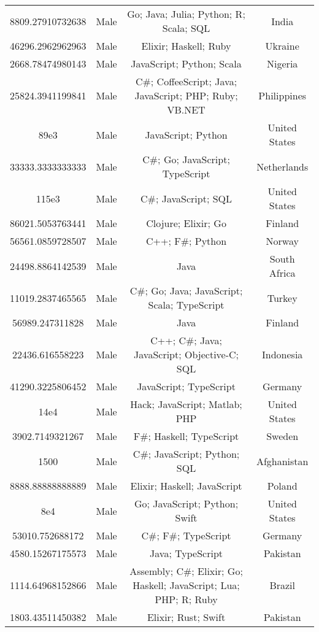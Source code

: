 \begin{center}
\begin{tabular}{ |c|c|c|c| }
8809.27910732638  &  Male  &  Go; Java; Julia; Python; R; Scala; SQL  &  India  \\ 
46296.2962962963  &  Male  &  Elixir; Haskell; Ruby  &  Ukraine  \\ 
2668.78474980143  &  Male  &  JavaScript; Python; Scala  &  Nigeria  \\ 
25824.3941199841  &  Male  &  C\#; CoffeeScript; Java; JavaScript; PHP; Ruby; VB.NET  &  Philippines  \\ 
89e3  &  Male  &  JavaScript; Python  &  United States  \\ 
33333.3333333333  &  Male  &  C\#; Go; JavaScript; TypeScript  &  Netherlands  \\ 
115e3  &  Male  &  C\#; JavaScript; SQL  &  United States  \\ 
86021.5053763441  &  Male  &  Clojure; Elixir; Go  &  Finland  \\ 
56561.0859728507  &  Male  &  C++; F\#; Python  &  Norway  \\ 
24498.8864142539  &  Male  &  Java  &  South Africa  \\ 
11019.2837465565  &  Male  &  C\#; Go; Java; JavaScript; Scala; TypeScript  &  Turkey  \\ 
56989.247311828  &  Male  &  Java  &  Finland  \\ 
22436.616558223  &  Male  &  C++; C\#; Java; JavaScript; Objective-C; SQL  &  Indonesia  \\ 
41290.3225806452  &  Male  &  JavaScript; TypeScript  &  Germany  \\ 
14e4  &  Male  &  Hack; JavaScript; Matlab; PHP  &  United States  \\ 
3902.7149321267  &  Male  &  F\#; Haskell; TypeScript  &  Sweden  \\ 
1500  &  Male  &  C\#; JavaScript; Python; SQL  &  Afghanistan  \\ 
8888.88888888889  &  Male  &  Elixir; Haskell; JavaScript  &  Poland  \\ 
8e4  &  Male  &  Go; JavaScript; Python; Swift  &  United States  \\ 
53010.752688172  &  Male  &  C\#; F\#; TypeScript  &  Germany  \\ 
4580.15267175573  &  Male  &  Java; TypeScript  &  Pakistan  \\ 
1114.64968152866  &  Male  &  Assembly; C\#; Elixir; Go; Haskell; JavaScript; Lua; PHP; R; Ruby  &  Brazil  \\ 
1803.43511450382  &  Male  &  Elixir; Rust; Swift  &  Pakistan  \\ 

\end{tabular}
\end{center}
